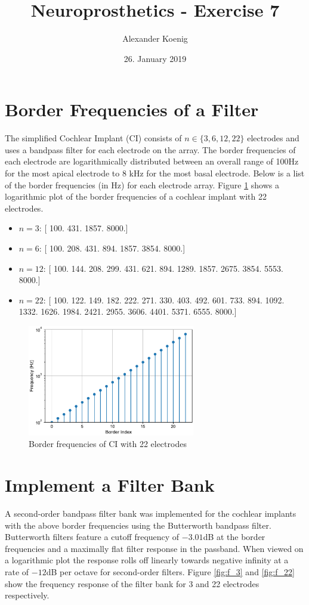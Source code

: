 \documentclass{scrartcl}
\title{Neuroprosthetics - Exercise 7}
\author{Alexander Koenig}
\date{26. January 2019}
\begin{document}
\maketitle

\section{Border Frequencies of a Filter}

The simplified Cochlear Implant (CI) consists of $n \in \{3, 6, 12, 22\}$ electrodes and uses a bandpass filter for each electrode on the array. The border frequencies of each electrode are logarithmically distributed between an overall range of 100Hz for the most apical electrode to 8 kHz for the most basal electrode. Below is a list of the border frequencies (in Hz) for each electrode array. Figure \ref{fig:borderf_22} shows a logarithmic plot of the border frequencies of a cochlear implant with 22 electrodes. 
\begin{itemize}
	\item $n=3$:	 [ 100.  431. 1857. 8000.]
	\item $n=6$: 	 [ 100.  208.  431.  894. 1857. 3854. 8000.]
	\item $n=12$: 	 [ 100.  144.  208.  299.  431.  621.  894. 1289. 1857. 2675. 3854. 5553.
 8000.]
 	\item $n=22$: 	 [ 100.  122.  149.  182.  222.  271.  330.  403.  492.  601.  733.  894.
 1092. 1332. 1626. 1984. 2421. 2955. 3606. 4401. 5371. 6555. 8000.]
\end{itemize}


\begin{figure}[h]
	\centering
	\includegraphics[width=0.65\textwidth]{figures/borders_CI_22}
	\caption{Border frequencies of CI with 22 electrodes}
	\label{fig:borderf_22}
\end{figure}

\newpage
\section{Implement a Filter Bank}
A second-order bandpass filter bank was implemented for the cochlear implants with the above border frequencies using the Butterworth bandpass filter. Butterworth filters feature a cutoff frequency of $-3.01$dB at the border frequencies and a maximally flat filter response in the passband. When viewed on a logarithmic plot the response rolls off linearly towards negative infinity at a rate of $-12$dB per octave for second-order filters. Figure \ref{fig:f_3} and \ref{fig:f_22} show the frequency response of the filter bank for 3 and 22 electrodes respectively. 
\end{document}
